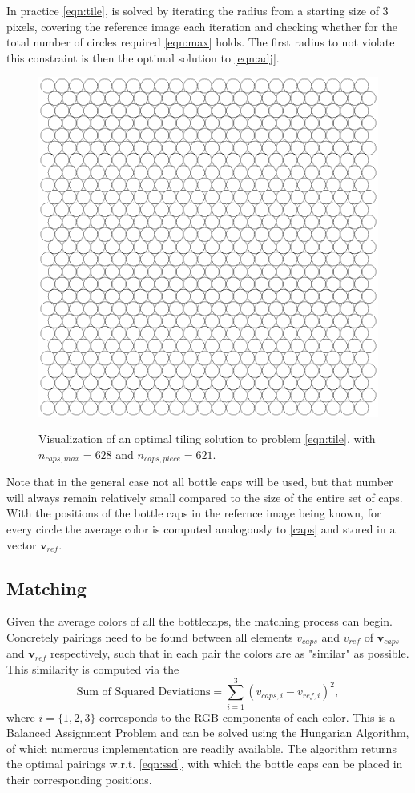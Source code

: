 \documentclass{article}
\begin{document}
In practice \ref{eqn:tile}, is solved by iterating the radius from a starting size of 3 pixels, covering the reference image each iteration and checking whether for the total number of circles required \ref{eqn:max} holds. The first radius to not violate this constraint is then the optimal solution to \ref{eqn:adj}.
\begin{figure}[h]
        \begin{center}
        \includegraphics[width=0.4\linewidth]{optimal_tiling.png}
        \label{opttile}
	\caption{Visualization of an optimal tiling solution to problem \ref{eqn:tile}, with $n_{caps,max} = 628$ and $n_{caps,piece} = 621$.}
\end{center}
\end{figure}
Note that in the general case not all bottle caps will be used, but that number will always remain relatively small compared to the size of the entire set of caps.
With the positions of the bottle caps in the refernce image being known, for every circle the average color is computed analogously to \ref{caps} and stored in a vector $\boldsymbol{v}_{ref}$. 
 
\subsection{Matching}
Given the average colors of all the bottlecaps, the matching process can begin. Concretely pairings need to be found between all elements $v_{caps}$ and $v_{ref}$ of $\boldsymbol{v}_{caps}$ and $\boldsymbol{v}_{ref}$ respectively, such that in each pair the colors are as "similar" as possible. This similarity is computed via the
\begin{equation}
\label{eqn:ssd}
	\text{Sum of Squared Deviations} = \sum_{i = 1}^{3} (v_{caps,i}-v_{ref,i})^2 ,
\end{equation}
where $i = \{1,2,3\}$ corresponds to the RGB components of each color.
This is a Balanced Assignment Problem and can be solved using the Hungarian Algorithm, \cite{https://doi.org/10.1002/nav.3800020109} of which numerous implementation are readily available. 
The algorithm returns the optimal pairings w.r.t. \ref{eqn:ssd}, with which the bottle caps can be placed in their corresponding positions.
\end{document}
